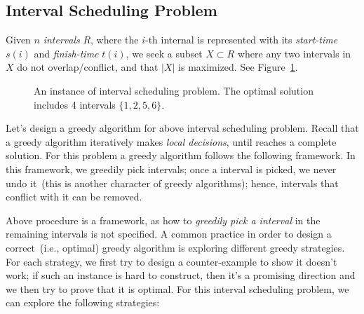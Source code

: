 \subsection*{Interval Scheduling Problem}

Given $n$ \emph{intervals} $R$, where the $i$-th internal is represented with
its \emph{start-time} $s(i)$ and \emph{finish-time} $t(i)$, we seek a subset $X\subset R$
where any two intervals in $X$ do not overlap/conflict, and that $|X|$ is maximized. 
See Figure~\ref{fig:interval}.

\begin{figure}[h]
\centering{}
\caption{An instance of interval scheduling problem.
The optimal solution includes 4 intervals $\{1, 2, 5, 6\}$.}
\label{fig:interval}
\end{figure}

Let's design a greedy algorithm for above interval scheduling problem.
Recall that a greedy algorithm iteratively makes \emph{local decisions},
until reaches a complete solution. For this problem
a greedy algorithm follows the following framework.
In this framework, we greedily pick intervals;
once a interval is picked, we never undo it~(this is another character of greedy algorithms);
hence, intervals that conflict with it can be removed.

\begin{algorithmblock}[0.8\textwidth]
	\xxx
	\xxx
	\xxx
	\aac {\textcolor{blue}{greedily pick an interval $x\in R$;}}\xxx
	\xxx
	\xxx
	\xxx
\end{algorithmblock}

Above procedure is a framework, as how to \emph{greedily pick a interval} in the remaining intervals is not specified.
A common practice in order to design a correct~(i.e., optimal) greedy algorithm is
exploring different greedy strategies. For each strategy, we first try to
design a counter-example to show it doesn't work; if such an instance
is hard to construct, then it's a promising direction and we then try to prove that it is optimal.
For this interval scheduling problem, we can explore the following strategies:

